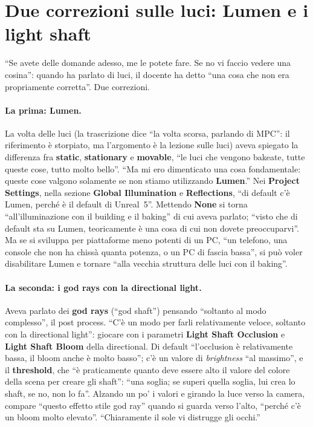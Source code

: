 \section{Due correzioni sulle luci: Lumen e i light shaft}
\label{ue15:sec:luci}

``Se avete delle domande adesso, me le potete fare. Se no vi faccio vedere una cosina'':
quando ha parlato di luci, il docente ha detto ``una cosa che non era propriamente
corretta''. Due correzioni.

\paragraph{La prima: Lumen.} La volta delle luci (la trascrizione dice ``la volta scorsa,
parlando di MPC'': il riferimento è storpiato, ma l'argomento è la lezione sulle luci) aveva
spiegato la differenza fra \textbf{static}, \textbf{stationary} e \textbf{movable}, ``le
luci che vengono bakeate, tutte queste cose, tutto molto bello''. ``Ma mi ero dimenticato una
cosa fondamentale: queste cose valgono solamente se non stiamo utilizzando \textbf{Lumen}.''
Nei \textbf{Project Settings}, nella sezione \textbf{Global Illumination} e
\textbf{Reflections}, ``di default c'è Lumen, perché è il default di Unreal~5''. Mettendo
\textbf{None} si torna ``all'illuminazione con il building e il baking'' di cui aveva
parlato; ``visto che di default sta su Lumen, teoricamente è una cosa di cui non dovete
preoccuparvi''. Ma se si sviluppa per piattaforme meno potenti di un PC, ``un telefono, una
console che non ha chissà quanta potenza, o un PC di fascia bassa'', si può voler
disabilitare Lumen e tornare ``alla vecchia struttura delle luci con il baking''.

\paragraph{La seconda: i god rays con la directional light.} Aveva parlato dei \textbf{god
rays} (``god shaft'') pensando ``soltanto al modo complesso'', il post process. ``C'è un modo
per farli relativamente veloce, soltanto con la directional light'': giocare con i parametri
\textbf{Light Shaft Occlusion} e \textbf{Light Shaft Bloom} della directional. Di default
``l'occlusion è relativamente bassa, il bloom anche è molto basso''; c'è un valore di
\emph{brightness} ``al massimo'', e il \textbf{threshold}, che ``è praticamente quanto deve
essere alto il valore del colore della scena per creare gli shaft'': ``una soglia; se superi
quella soglia, lui crea lo shaft, se no, non lo fa''. Alzando un po' i valori e girando la
luce verso la camera, compare ``questo effetto stile god ray'' quando si guarda verso l'alto,
``perché c'è un bloom molto elevato''. ``Chiaramente il sole vi distrugge gli occhi.''

